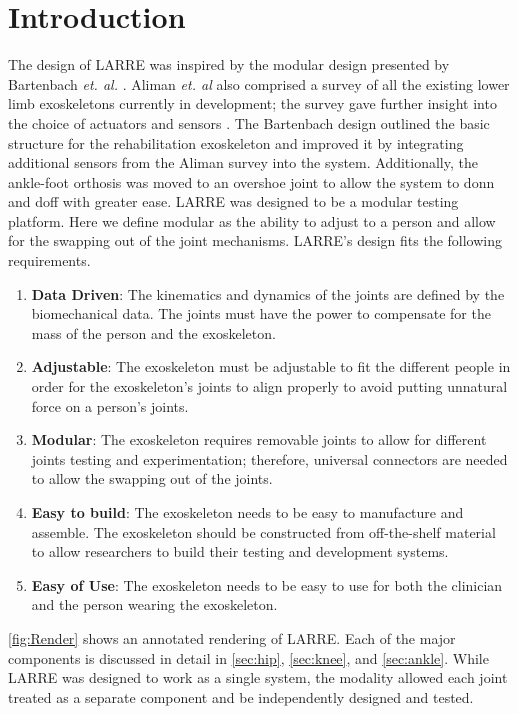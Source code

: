 \section{Introduction}
The design of LARRE was inspired by the modular design presented by Bartenbach \textit{et. al.} \cite{7523699}.  Aliman \textit{et. al} also comprised a survey of all the existing lower limb exoskeletons currently in development; the survey gave further insight into the choice of actuators and sensors \cite{aliman2017design}. The Bartenbach design outlined the basic structure for the rehabilitation exoskeleton and improved it by integrating additional sensors from the Aliman survey into the system. Additionally, the ankle-foot orthosis was moved to an overshoe joint to allow the system to donn and doff with greater ease.
LARRE was designed to be a modular testing platform. Here we define modular as the ability to adjust to a person and allow for the swapping out of the joint mechanisms. LARRE's design fits the following requirements. 


\begin{enumerate}[noitemsep]
\item \textbf{Data Driven}: The kinematics and dynamics of the joints are defined by the biomechanical data. The joints must have the power to compensate for the mass of the person and the exoskeleton. 
\item \textbf{Adjustable}: The exoskeleton must be adjustable to fit the different people in order for the exoskeleton's joints to align properly to avoid putting unnatural force on a person's joints. 
\item \textbf{Modular}: The exoskeleton requires removable joints to allow for different joints testing and experimentation; therefore, universal connectors are needed to allow the swapping out of the joints. 
\item \textbf{Easy to build}: The exoskeleton needs to be easy to manufacture and assemble. The exoskeleton should be constructed from off-the-shelf material to allow researchers to build their testing and development systems. 
\item \textbf{Easy of Use}: The exoskeleton needs to be easy to use for both the clinician and the person wearing the exoskeleton. 
\end{enumerate}

 \autoref{fig:Render} shows an annotated rendering of LARRE.  Each of the major components is discussed in detail in  \autoref{sec:hip}, \autoref{sec:knee}, and \autoref{sec:ankle}. While LARRE was designed to work as a single system, the modality allowed each joint treated as a separate component and be independently designed and tested. 

